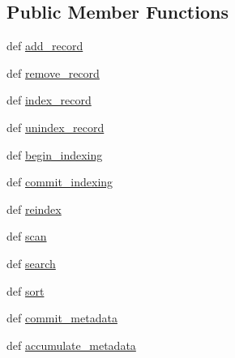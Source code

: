 \subsection*{Public Member Functions}
\begin{DoxyCompactItemize}
\item 
def \hyperlink{classcheshire3_1_1base_objects_1_1_database_aae016d2565db192c7d2c62af7501268d}{add\-\_\-record}
\item 
def \hyperlink{classcheshire3_1_1base_objects_1_1_database_a56408296a0b71a2ed099120f2bc2b10e}{remove\-\_\-record}
\item 
def \hyperlink{classcheshire3_1_1base_objects_1_1_database_ad1b991cef210247da92f79d31152f74b}{index\-\_\-record}
\item 
def \hyperlink{classcheshire3_1_1base_objects_1_1_database_aa4aef9057cc3a4038628757be5b6beff}{unindex\-\_\-record}
\item 
def \hyperlink{classcheshire3_1_1base_objects_1_1_database_a218ca1e3168c33711546e426b078f195}{begin\-\_\-indexing}
\item 
def \hyperlink{classcheshire3_1_1base_objects_1_1_database_a326d77c1e7e2ff6524f814b70a1c2df0}{commit\-\_\-indexing}
\item 
def \hyperlink{classcheshire3_1_1base_objects_1_1_database_a5c7f19ce496b34407f18c50c9fb5e529}{reindex}
\item 
def \hyperlink{classcheshire3_1_1base_objects_1_1_database_a5dd5451a67c9a8f2e656c0204737a00d}{scan}
\item 
def \hyperlink{classcheshire3_1_1base_objects_1_1_database_a9589a90924f4ef4bf5273aa11e73eafe}{search}
\item 
def \hyperlink{classcheshire3_1_1base_objects_1_1_database_ab105b3ff4e840a7ee521b5702e9e1d05}{sort}
\item 
def \hyperlink{classcheshire3_1_1base_objects_1_1_database_ad1b7b803f58449bdb6bc319bd7292734}{commit\-\_\-metadata}
\item 
def \hyperlink{classcheshire3_1_1base_objects_1_1_database_acd96c9dea16c9839aeef076b1f90d76d}{accumulate\-\_\-metadata}
\end{DoxyCompactItemize}
